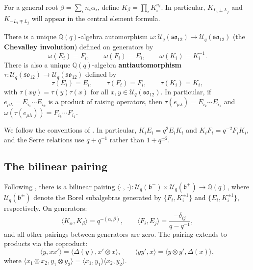 \documentclass{ximera}
\newcommand{\so}{\mathfrak{so}}
\newcommand{\Uq}{\mathcal{U}_q}
\begin{document}
For a general root $\beta = \sum_{i} n_i \alpha_i$, define $K_\beta = \prod_i K_i^{n_i}$. In particular, $K_{L_i \pm L_j}$ and $K_{-L_i \mp L_j}$ will appear in the central element formula.

There is a unique $\mathbb{Q}(q)$-algebra automorphism $\omega \colon \Uq(\so_{12}) \to \Uq(\so_{12})$ (the \textbf{Chevalley involution}) defined on generators by
\begin{equation}\label{eq:omega}
    \omega(E_i) = F_i, \qquad \omega(F_i) = E_i, \qquad \omega(K_i) = K_i^{-1}.
\end{equation}
There is also a unique $\mathbb{Q}(q)$-algebra \textbf{antiautomorphism} $\tau \colon \Uq(\so_{12}) \to \Uq(\so_{12})$ defined by
\begin{equation}\label{eq:tau}
    \tau(E_i) = E_i, \qquad \tau(F_i) = F_i, \qquad \tau(K_i) = K_i,
\end{equation}
with $\tau(xy) = \tau(y)\tau(x)$ for all $x, y \in \Uq(\so_{12})$. In particular, if $e_{\mu\lambda} = E_{i_1} \cdots E_{i_k}$ is a product of raising operators, then $\tau(e_{\mu\lambda}) = E_{i_k} \cdots E_{i_1}$ and $\omega(\tau(e_{\mu\lambda})) = F_{i_k} \cdots F_{i_1}$.

\begin{remark}\label{rmk:conventions}
We follow the conventions of \cite{Jan95, kuan2020}. In particular, $K_i E_i = q^2 E_i K_i$ and $K_i F_i = q^{-2} F_i K_i$, and the Serre relations use $q + q^{-1}$ rather than $1 + q^{\pm 2}$.
\end{remark}

\subsection{The bilinear pairing}\label{subsec:pairing}

Following \cite[Chapter~6]{Jan95}, there is a bilinear pairing $\langle \cdot\,,\, \cdot \rangle \colon \Uq(\mathfrak{b}^-) \times \Uq(\mathfrak{b}^+) \to \mathbb{Q}(q)$, where $\Uq(\mathfrak{b}^\pm)$ denote the Borel subalgebras generated by $\{F_i, K_i^{\pm 1}\}$ and $\{E_i, K_i^{\pm 1}\}$, respectively. On generators:
\[
    \langle K_\alpha, K_\beta \rangle = q^{-(\alpha, \beta)}, \qquad \langle F_i, E_j \rangle = \frac{-\delta_{ij}}{q - q^{-1}},
\]
and all other pairings between generators are zero. The pairing extends to products via the coproduct:
\[
    \langle y, xx' \rangle = \langle \Delta(y), x' \otimes x \rangle, \qquad \langle yy', x \rangle = \langle y \otimes y', \Delta(x) \rangle,
\]
where $\langle x_1 \otimes x_2, y_1 \otimes y_2 \rangle = \langle x_1, y_1 \rangle \langle x_2, y_2 \rangle$.
\end{document}
